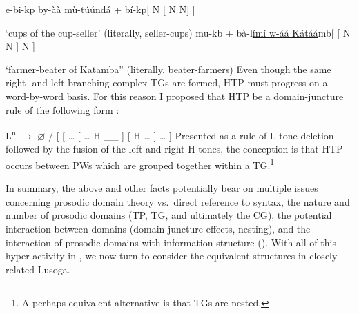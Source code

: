 \documentclass[output=paper]{langsci/langscibook}
\begin{document}
\ea\label{ex:key:13.18}
    \ea   e-bi-kp  by-àà  mù-\underline{túúndá +
    bí}-kp\hfill  [ N [ N N]
    ]\\\vspace{1\baselineskip}
		 ‘cups of the cup-seller’ (literally, seller-cups)
         \ex mu-kb + bà-l\underline{ímí  w-áá
             Kátáá}mb\hfill [ [ N N ] N
             ]\\\vspace{1\baselineskip}
    ‘farmer-beater of Katamba” (literally, beater-farmers)
    \z
\z
Even though the same right- and left-branching complex \glspl{TG} are formed,
\gls{HTP} must progress on a word-by-word basis. For this reason I proposed
that \gls{HTP} be a domain-juncture rule of the following form
\citep[158]{Hyman1988}:

\ea\label{ex:key:13.19}
    L\textsuperscript{n}  ${\rightarrow}$  $\varnothing$  /  [  [ \dots{} [ \dots{} H \_\_ ] [ H \dots{} ] \dots{} ]
\z
Presented as a rule of L tone deletion followed by the fusion of the left and
right H tones, the conception is that \gls{HTP} occurs between \glspl{PW} which
are grouped together within a \gls{TG}.\footnote{A perhaps equivalent
    alternative is that \glspl{TG} are nested.}

In summary, the above and other  facts potentially bear on multiple
issues concerning prosodic domain theory vs.\ direct reference to syntax, the
nature and number of prosodic domains (\gls{TP}, \gls{TG}, and ultimately the
\gls{CG}), the potential interaction between domains (domain juncture effects,
nesting), and the interaction of prosodic domains with information structure
(). With all of this hyper-activity in , we now turn to consider
the equivalent structures in closely related Lusoga.
\end{document}
